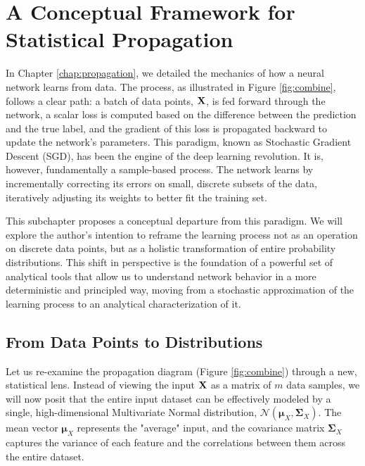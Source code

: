 \ifdefined\ispartofbook
\else
  
  
\fi


\section{A Conceptual Framework for Statistical Propagation}
\label{sec:conceptual_framework_stats}

In Chapter \ref{chap:propagation}, we detailed the mechanics of how a neural network learns from data. The process, as illustrated in Figure \ref{fig:combine}, follows a clear path: a batch of data points, $\mathbf{X}$, is fed forward through the network, a scalar loss is computed based on the difference between the prediction and the true label, and the gradient of this loss is propagated backward to update the network's parameters. This paradigm, known as Stochastic Gradient Descent (SGD), has been the engine of the deep learning revolution. It is, however, fundamentally a sample-based process. The network learns by incrementally correcting its errors on small, discrete subsets of the data, iteratively adjusting its weights to better fit the training set.

This subchapter proposes a conceptual departure from this paradigm. We will explore the author's intention to reframe the learning process not as an operation on discrete data points, but as a holistic transformation of entire probability distributions. This shift in perspective is the foundation of a powerful set of analytical tools that allow us to understand network behavior in a more deterministic and principled way, moving from a stochastic approximation of the learning process to an analytical characterization of it.

\subsection{From Data Points to Distributions}
Let us re-examine the propagation diagram (Figure \ref{fig:combine}) through a new, statistical lens. Instead of viewing the input $\mathbf{X}$ as a matrix of $m$ data samples, we will now posit that the entire input dataset can be effectively modeled by a single, high-dimensional Multivariate Normal distribution, $\mathcal{N}(\boldsymbol{\mu}_X, \boldsymbol{\Sigma}_X)$. The mean vector $\boldsymbol{\mu}_X$ represents the "average" input, and the covariance matrix $\boldsymbol{\Sigma}_X$ captures the variance of each feature and the correlations between them across the entire dataset.

